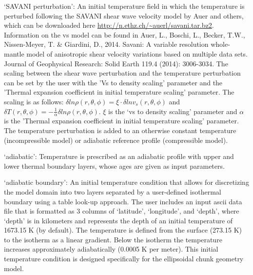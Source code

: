 \begin{itemize}
`SAVANI perturbation': An initial temperature field in which the temperature is perturbed following the SAVANI shear wave velocity model by Auer and others, which can be downloaded here \url{http://n.ethz.ch/~auerl/savani.tar.bz2}. Information on the vs model can be found in Auer, L., Boschi, L., Becker, T.W., Nissen-Meyer, T. \& Giardini, D., 2014. Savani: A variable resolution whole-mantle model of anisotropic shear velocity variations based on multiple data sets. Journal of Geophysical Research: Solid Earth 119.4 (2014): 3006-3034. The scaling between the shear wave perturbation and the temperature perturbation can be set by the user with the 'Vs to density scaling' parameter and the 'Thermal expansion coefficient in initial temperature scaling' parameter. The scaling is as follows: $\delta ln \rho (r,\theta,\phi) = \xi \cdot \delta ln v_s(r,\theta, \phi)$ and $\delta T(r,\theta,\phi) = - \frac{1}{\alpha} \delta ln \rho(r,\theta,\phi)$. $\xi$ is the `vs to density scaling' parameter and $\alpha$ is the 'Thermal expansion coefficient in initial temperature scaling' parameter. The temperature perturbation is added to an otherwise constant temperature (incompressible model) or adiabatic reference profile (compressible model).

`adiabatic': Temperature is prescribed as an adiabatic profile with upper and lower thermal boundary layers, whose ages are given as input parameters.

`adiabatic boundary': An initial temperature condition that allows for discretizing the model domain into two layers separated by a user-defined isothermal boundary using a table look-up approach. The user includes an input ascii data file that is formatted as 3 columns of `latitude', `longitude', and `depth', where `depth' is in kilometers and represents the depth of an initial temperature of 1673.15 K (by default). The temperature is defined from the surface (273.15 K) to the isotherm as a linear gradient. Below the isotherm the temperature increases approximately adiabatically (0.0005 K per meter). This initial temperature condition is designed specifically for the ellipsoidal chunk geometry model.


\end{itemize}
